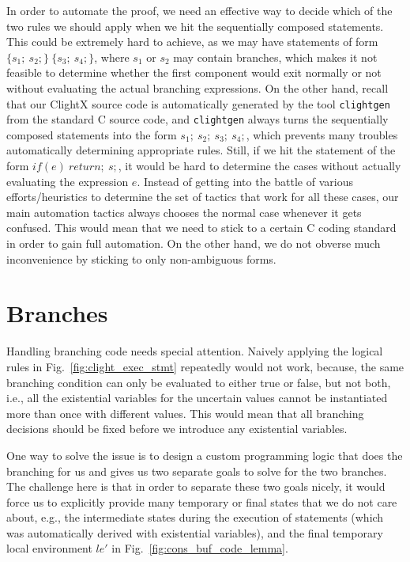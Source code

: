 In order to automate the proof, we need an effective way to decide which
of the two rules we should apply when we hit the sequentially composed statements.
This could be extremely hard to achieve, as we may have statements of form
$\{s_1;~s_2;\}~\{s_3;~s_4;\}$, where $s_1$ or $s_2$ may contain branches,
which makes it not feasible to determine whether the first component would exit
normally or not without evaluating the actual branching expressions.
On the other hand, recall that our ClightX source code is automatically generated
by the tool \texttt{clightgen} from the standard C source code, and \texttt{clightgen}
always turns the sequentially composed statements into the form
$s_1;~s_2;~s_3;~s_4;$, which prevents many troubles automatically determining
appropriate rules. Still, if we hit the statement of the form $if(e)~return;~s;$,
it would be hard to determine the cases without actually evaluating the expression
$e$. Instead of getting into the battle of various efforts/heuristics to determine
the set of tactics that work for all these cases, our main automation tactics
always chooses the normal case whenever it gets confused. This would mean that
we need to stick to a certain C coding standard in order to gain full automation.
On the other hand, we do not obverse much inconvenience by sticking to only
non-ambiguous forms.

\section{Branches}

Handling branching code needs special attention. Naively applying the logical
rules in Fig.~\ref{fig:clight_exec_stmt} repeatedly would not work, because,
the same branching condition can only be evaluated to either true or false,
but not both, i.e., all the existential variables for the uncertain values
cannot be instantiated more than once with different values.
This would mean that all branching decisions should be fixed before we introduce
any existential variables. 

One way to solve the issue is to design a custom programming logic that does
the branching for us and gives us two separate goals to solve for the two branches.
The challenge here is that in order to separate these two goals nicely, it would
force us to explicitly provide many temporary or final states that we do not care
about, e.g., the intermediate states during the execution of statements (which
was automatically derived with existential variables), and the final temporary
local environment $le'$ in Fig.~\ref{fig:cons_buf_code_lemma}.

